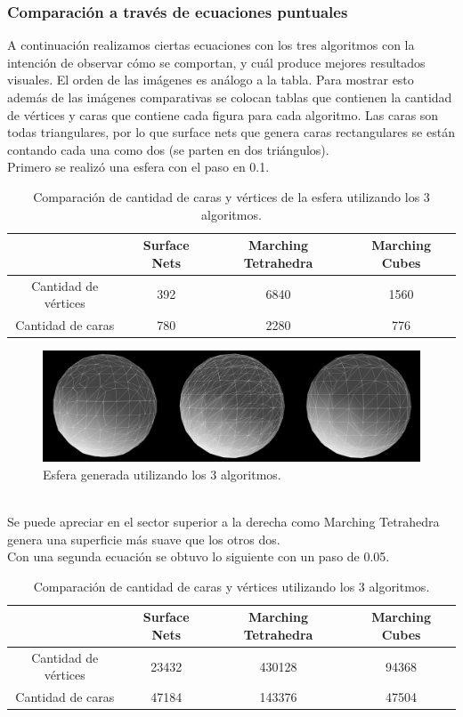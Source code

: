 \documentclass[12pt]{article}
\begin{document}
\subsubsection{Comparación a través de ecuaciones puntuales}
A continuación realizamos ciertas ecuaciones con los tres algoritmos con la intención de observar cómo se comportan, y cuál produce mejores resultados visuales. El orden de las imágenes es análogo a la tabla. Para mostrar esto además de las imágenes comparativas se colocan tablas que contienen la cantidad de vértices y caras que contiene cada figura para cada algoritmo. Las caras son todas triangulares, por lo que surface nets que genera caras rectangulares se están contando cada una como dos (se parten en dos triángulos).
\\Primero se realizó una esfera con el paso en 0.1.
\begin{table}[h!]
  \centering
  \label{tab:table1}
  \begin{tabular}{cccc}
    \toprule
    & Surface Nets & Marching Tetrahedra & Marching Cubes\\
    \midrule
    Cantidad de vértices & 392 & 6840 & 1560\\
    Cantidad de caras & 780 & 2280 & 776\\
    \bottomrule
  \end{tabular}
  \caption{Comparación de cantidad de caras y vértices de la esfera utilizando los 3 algoritmos.}
\end{table}
\begin{figure}[h!]
\includegraphics[width=\linewidth,center]{compec1.png}
\caption{Esfera generada utilizando los 3 algoritmos.}
\end{figure}
\\Se puede apreciar en el sector superior a la derecha como Marching Tetrahedra genera una superficie más suave que los otros dos.
\\Con una segunda ecuación se obtuvo lo siguiente con un paso de 0.05.
\begin{table}[h!]
  \centering
  \label{tab:table1}
  \begin{tabular}{cccc}
    \toprule
    & Surface Nets & Marching Tetrahedra & Marching Cubes\\
    \midrule
    Cantidad de vértices & 23432 & 430128 & 94368\\
    Cantidad de caras & 47184 & 143376 & 47504\\
    \bottomrule
  \end{tabular}
  \caption{Comparación de cantidad de caras y vértices utilizando los 3 algoritmos.}
\end{table}
\end{document}
